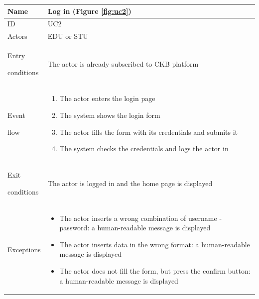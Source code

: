 \begin{center}
    \def\arraystretch{1.5}
    \begin{tabular}{| m{2cm} | m{10cm}|}
        \hline
        Name                  & Log in (Figure \ref{fig:uc2})                                                                                           \\ \hline
        ID                    & UC2                                                                                                 \\ \hline
        Actors                & EDU or STU                                                                                          \\ \hline
        Entry \par conditions & The actor is already subscribed to CKB platform                                                 \\ \hline
        Event \par flow       & \begin{enumerate}
                                    \item The actor enters the login page
                                    \item The system shows the login form
                                    \item The actor fills the form with its credentials and submits it
                                    \item The system checks the credentials and logs the actor in
                                \end{enumerate}                                   \\ \hline
        Exit \par conditions  & The actor is logged in and the home page is displayed                                           \\ \hline
        Exceptions            & \begin{itemize}
                                    \item The actor inserts a wrong combination of username - password: a human-readable message is displayed 
                                    \item The actor inserts data in the wrong format: a human-readable message is displayed
                                    \item The actor does not fill the form, but press the confirm button: a human-readable message is displayed
                                \end{itemize}\\ \hline

    \end{tabular}
\end{center}


